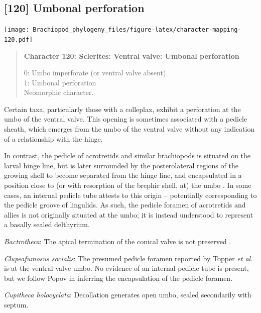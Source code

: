 \documentclass[openany]{book}
\begin{document}
\subsection*{{[}120{]} Umbonal perforation}\label{umbonal-perforation}

\texttt{[image: Brachiopod\_phylogeny\_files/figure-latex/character-mapping-120.pdf]}

\begin{quote}
\textbf{Character 120: Sclerites: Ventral valve: Umbonal perforation}

0: Umbo imperforate (or ventral valve absent)\\
1: Umbonal perforation\\
Neomorphic character.
\end{quote}

Certain taxa, particularly those with a colleplax, exhibit a perforation
at the umbo of the ventral valve. This opening is sometimes associated
with a pedicle sheath, which emerges from the umbo of the ventral valve
without any indication of a relationship with the hinge.

In contrast, the pedicle of acrotretids and similar brachiopods is
situated on the larval hinge line, but is later surrounded by the
posterolateral regions of the growing shell to become separated from the
hinge line, and encapsulated in a position close to (or with resorption
of the brephic shell, at) the umbo \citep[see][pp.~407--411 and fig. 3
for discussion]{Popov1992TheCambrian}. In some cases, an internal
pedicle tube attests to this origin -- potentially corresponding to the
pedicle groove of lingulids. As such, the pedicle foramen of acrotretids
and allies is not originally situated at the umbo; it is instead
understood to represent a basally sealed delthyrium.

\hypertarget{Bactrotheca-coding-120}{}
\emph{Bactrotheca}: The apical termination of the conical valve is not
preserved \citep{Valent2012}.

\hypertarget{Clupeafumosus_socialis-coding-120}{}
\emph{Clupeafumosus socialis}: The presumed pedicle foramen reported by
Topper \emph{et al}. \citeyearpar{Topper2013Reappraisalof} is at the
ventral valve umbo. No evidence of an internal pedicle tube is present,
but we follow Popov \citeyearpar{Popov1992TheCambrian} in inferring the
encapsulation of the pedicle foramen.

\hypertarget{Cupitheca_holocyclata-coding-120}{}
\emph{Cupitheca holocyclata}: Decollation generates open umbo, sealed
secondarily with septum.
\end{document}
